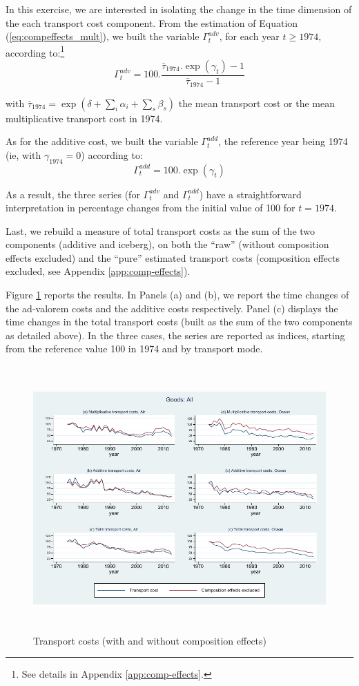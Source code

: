 \documentclass[a4paper,11pt]{article}
\begin{document}
In this exercise, we are interested in isolating the change in the time dimension of the each transport cost component. From the estimation of Equation (\ref{eq:compeffects_mult}), we built the variable $\Gamma^{adv}_t$, for each year $t\geq 1974$, according to:\footnote{See details in Appendix \ref{app:comp-effects}.}
\begin{equation*}
\Gamma^{adv}_t = 100.\frac {\bar{\tau}_{1974}.\exp(\gamma_t)-1} {\bar{\tau}_{1974}-1}
\end{equation*}

\noindent with $\bar{\tau}_{1974} = \exp(\delta +\sum_i \alpha_i +\sum_s \beta_s)$ the mean transport cost or the mean multiplicative transport cost in 1974.

As for the additive cost, we built the variable $\Gamma^{add}_t$, the reference year being 1974 (ie, with $\gamma_{1974}=0$) according to:
$$\Gamma^{add}_t = 100.\exp(\gamma_t)$$

\noindent As a result, the three series (for $\Gamma^{adv}_t$ and $\Gamma^{add}_t$) have a straightforward interpretation in percentage changes from the initial value of 100 for $t=1974$.

Last, we rebuild a measure of total transport costs as the sum of the two components (additive and iceberg), on both the ``raw'' (without composition effects excluded) and the ``pure'' estimated transport costs (composition effects excluded, see Appendix \ref{app:comp-effects}). 

Figure \ref{fig:totalTC_compeffects_excl} reports the results. In Panels (a) and (b), we report the time changes of the ad-valorem costs and the additive costs respectively. Panel (c) displays the time changes in the total transport costs (built as the sum of the two components as detailed above). In the three cases, the series are reported as indices, starting from the reference value 100 in 1974 and by transport mode.

\begin{figure}[htbp]
\caption{Transport costs (with and without composition effects)}
\label{fig:totalTC_compeffects_excl}
\begin{center}
\includegraphics[height=4in]
{graph_composition_all.pdf}
\end{center}
\end{figure}
\end{document}
